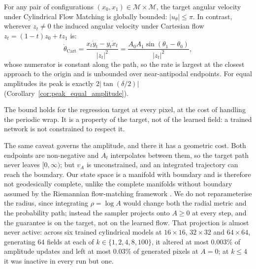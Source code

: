 \begin{lemma}
\label{lem:bounded_velocity}
For any pair of configurations $(x_0, x_1) \in \mathcal{M} \times \mathcal{M}$, the target angular velocity under Cylindrical Flow Matching is globally bounded: $|u_\theta| \le \pi$. In contrast, wherever $z_t \ne 0$ the induced angular velocity under Cartesian flow $z_t = (1-t)z_0 + t z_1$ is:
\begin{equation}
    \dot{\theta}_{\mathrm{Cart}} = \frac{x_t \dot{y}_t - y_t \dot{x}_t}{|z_t|^2} = \frac{A_0 A_1 \sin(\theta_1 - \theta_0)}{|z_t|^2},
\end{equation}
whose numerator is constant along the path, so the rate is largest at the closest approach to the origin and is unbounded over near-antipodal endpoints. For equal amplitudes its peak is exactly $2|\tan(\delta/2)|$ (Corollary~\ref{cor:peak_equal_amplitude}).
\end{lemma}
The bound holds for the regression target at every pixel, at the cost of handling the periodic wrap. It is a property of the target, not of the learned field: a trained network is not constrained to respect it.

The same caveat governs the amplitude, and there it has a geometric cost. Both endpoints are non-negative and $A_t$ interpolates between them, so the target path never leaves $[0, \infty)$; but $v_A$ is unconstrained, and an integrated trajectory can reach the boundary. Our state space is a manifold with boundary and is therefore not geodesically complete, unlike the complete manifolds without boundary assumed by the Riemannian flow-matching framework \citep{chen2024flow}. We do not reparameterise the radius, since integrating $\rho = \log A$ would change both the radial metric and the probability path; instead the sampler projects onto $A \ge 0$ at every step, and the guarantee is on the target, not on the learned flow. That projection is almost never active: across six trained cylindrical models at $16\times16$, $32\times32$ and $64\times64$, generating $64$ fields at each of $k \in \{1, 2, 4, 8, 100\}$, it altered at most $0.003\%$ of amplitude updates and left at most $0.03\%$ of generated pixels at $A = 0$; at $k \le 4$ it was inactive in every run but one.

